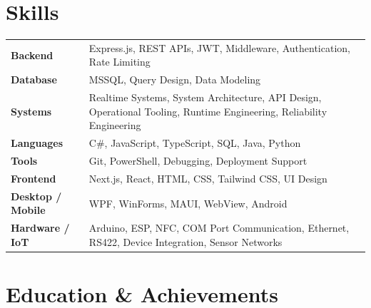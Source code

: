 \documentclass[a4paper,10pt]{article}
\begin{document}
\section*{Skills}

\begin{tabularx}{\textwidth}{@{}>{\raggedright\arraybackslash}p{}X@{}}
\textbf{Backend} & Express.js, REST APIs, JWT, Middleware, Authentication, Rate Limiting \\
\textbf{Database} & MSSQL, Query Design, Data Modeling \\
\textbf{Systems} & Realtime Systems, System Architecture, API Design, Operational Tooling, Runtime Engineering, Reliability Engineering \\
\textbf{Languages} & C\#, JavaScript, TypeScript, SQL, Java, Python \\
\textbf{Tools} & Git, PowerShell, Debugging, Deployment Support \\
\textbf{Frontend} & Next.js, React, HTML, CSS, Tailwind CSS, UI Design \\
\textbf{Desktop / Mobile} & WPF, WinForms, MAUI, WebView, Android \\
\textbf{Hardware / IoT} & Arduino, ESP, NFC, COM Port Communication, Ethernet, RS422, Device Integration, Sensor Networks \\
\end{tabularx}

\section*{Education \& Achievements}
\end{document}
